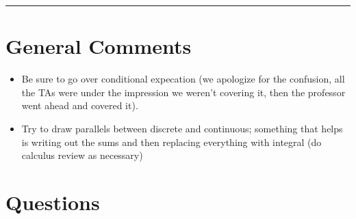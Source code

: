 \documentclass{exam}
\title{}
\date{Markov Chains, Continuous Probability, Conditional Expectation}
\begin{document}
\maketitle
\rule{\textwidth}{0.15em}
\fontsize{12}{15}\selectfont
\thispagestyle{empty}


\section{General Comments}
\begin{itemize}
\item Be sure to go over conditional expecation (we apologize for the confusion, all the TAs were under the impression we weren't covering it, then the professor went ahead and covered it).
\item Try to draw parallels between discrete and continuous; something that helps is writing out the sums and then replacing everything with integral (do calculus review as necessary)
\end{itemize}


\section{Questions}
\end{document}
